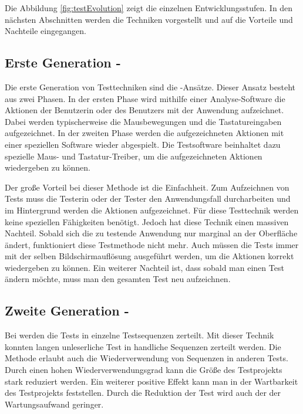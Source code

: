 \SuperPar
Die Abbildung \ref{fig:testEvolution} zeigt die einzelnen Entwicklungsstufen. In den nächsten Abschnitten werden die Techniken vorgestellt und auf die Vorteile und Nachteile eingegangen.

\subsection{Erste Generation - }

Die erste Generation von Testtechniken sind die -Ansätze. Dieser Ansatz besteht aus zwei Phasen. In der ersten Phase wird mithilfe einer Analyse-Software die Aktionen der Benutzerin oder des Benutzers mit der Anwendung aufzeichnet. Dabei werden typischerweise die Mausbewegungen und die Tastatureingaben aufgezeichnet. In der zweiten Phase werden die aufgezeichneten Aktionen mit einer speziellen Software wieder abgespielt. Die Testsoftware beinhaltet dazu spezielle Maus- und Tastatur-Treiber, um die aufgezeichneten Aktionen wiedergeben zu können.

\SuperPar
Der große Vorteil bei dieser Methode ist die Einfachheit. Zum Aufzeichnen von Tests muss die Testerin oder der Tester den Anwendungsfall durcharbeiten und im Hintergrund werden die Aktionen aufgezeichnet. Für diese Testtechnik werden keine speziellen Fähigkeiten benötigt. Jedoch hat diese Technik einen massiven Nachteil. Sobald sich die zu testende Anwendung nur marginal an der Oberfläche ändert, funktioniert diese Testmethode nicht mehr. Auch müssen die Tests immer mit der selben Bildschirmauflösung ausgeführt werden, um die Aktionen korrekt wiedergeben zu können. Ein weiterer Nachteil ist, dass sobald man einen Test ändern möchte, muss man den gesamten Test neu aufzeichnen.

\subsection{Zweite Generation - }

Bei  werden die Tests in einzelne Testsequenzen zerteilt. Mit dieser Technik konnten langen unleserliche Test in handliche Sequenzen zerteilt werden. Die Methode erlaubt auch die Wiederverwendung von Sequenzen in anderen Tests. Durch einen hohen Wiederverwendungsgrad kann die Größe des Testprojekts stark reduziert werden. Ein weiterer positive Effekt kann man in der Wartbarkeit des Testprojekts feststellen. Durch die Reduktion der Test wird auch der der Wartungsaufwand geringer.

